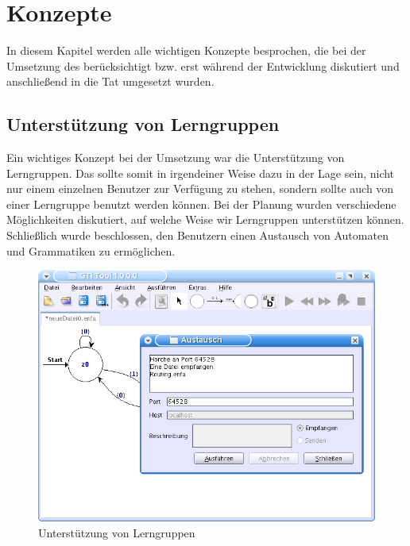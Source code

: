 



\chapter{Konzepte}\label{Concepts}

In diesem Kapitel werden alle wichtigen Konzepte besprochen, die bei der
Umsetzung des \gtitools berücksichtigt bzw. erst während der Entwicklung
diskutiert und anschließend in die Tat umgesetzt wurden.\vspace{10pt}


\section{Unterstützung von Lerngruppen}\label{ConceptsLerning}

Ein wichtiges Konzept bei der Umsetzung war die Unterstützung von Lerngruppen.
Das \gtitool sollte somit in irgendeiner Weise dazu in der Lage sein, nicht nur
einem einzelnen Benutzer zur Verfügung zu stehen, sondern sollte auch von einer
Lerngruppe benutzt werden können. Bei der Planung wurden verschiedene
Möglichkeiten diskutiert, auf welche Weise wir Lerngruppen unterstützen
können. Schließlich wurde beschlossen, den Benutzern einen Austausch von
Automaten und Grammatiken zu ermöglichen.\vspace{10pt}

\begin{figure}[h!]
\begin{center}
\includegraphics[width=12cm]{../images/exchange.png}
\caption{Unterstützung von Lerngruppen}
\label{FigureExchange}
\end{center}
\end{figure}
\vspace{10pt}

